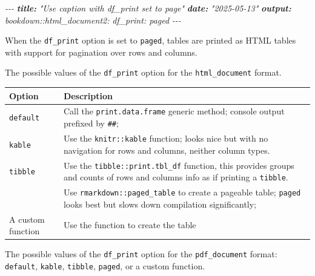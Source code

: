 \documentclass[
  a4paper,
  twoside,
  openright]{book}
\newenvironment{Shaded}{\begin{snugshade}}{\end{snugshade}}
\newcommand{\AnnotationTok}[1]{\textcolor[rgb]{0.56,0.35,0.01}{\textbf{\textit{#1}}}}
\newcommand{\CommentTok}[1]{\textcolor[rgb]{0.56,0.35,0.01}{\textit{#1}}}
\theoremstyle{definition}
\theoremstyle{definition}
\theoremstyle{definition}
\theoremstyle{definition}
\theoremstyle{remark}
\begin{document}
\begin{Shaded}
\begin{Highlighting}[]
\CommentTok{{-}{-}{-}}
\AnnotationTok{title:}\CommentTok{ "Use caption with df\_print set to page"}
\AnnotationTok{date:}\CommentTok{ "2025{-}05{-}13"}
\AnnotationTok{output:}
\CommentTok{  bookdown::html\_document2:}
\CommentTok{    df\_print: paged}
\CommentTok{{-}{-}{-}}
\end{Highlighting}
\end{Shaded}

When the \texttt{df\_print} option is set to \texttt{paged}, tables are printed as HTML tables with support for pagination over rows and columns.

The possible values of the \texttt{df\_print} option for the \texttt{html\_document} format.

\begin{longtable}[]{@{}
  >{\raggedright\arraybackslash}p{}
  >{\raggedright\arraybackslash}p{}@{}}
\toprule\noalign{}
\begin{minipage}[b]{\linewidth}\raggedright
Option
\end{minipage} & \begin{minipage}[b]{\linewidth}\raggedright
Description
\end{minipage} \\
\midrule\noalign{}
\endhead
\bottomrule\noalign{}
\endlastfoot
\texttt{default} & Call the \texttt{print.data.frame} generic method; console output prefixed by \texttt{\#\#}; \\
\texttt{kable} & Use the \texttt{knitr::kable} function; looks nice but with no navigation for rows and columns, neither column types. \\
\texttt{tibble} & Use the \texttt{tibble::print.tbl\_df} function, this provides groups and counts of rows and columns info as if printing a \texttt{tibble}. \\
{\texttt{paged}} & Use \texttt{rmarkdown::paged\_table} to create a pageable table; \texttt{paged} looks best but slows down compilation significantly; \\
A custom function & Use the function to create the table \\
\end{longtable}

The possible values of the \texttt{df\_print} option for the \texttt{pdf\_document} format: \texttt{default}, \texttt{kable}, \texttt{tibble}, \texttt{paged}, or a custom function.
\end{document}

